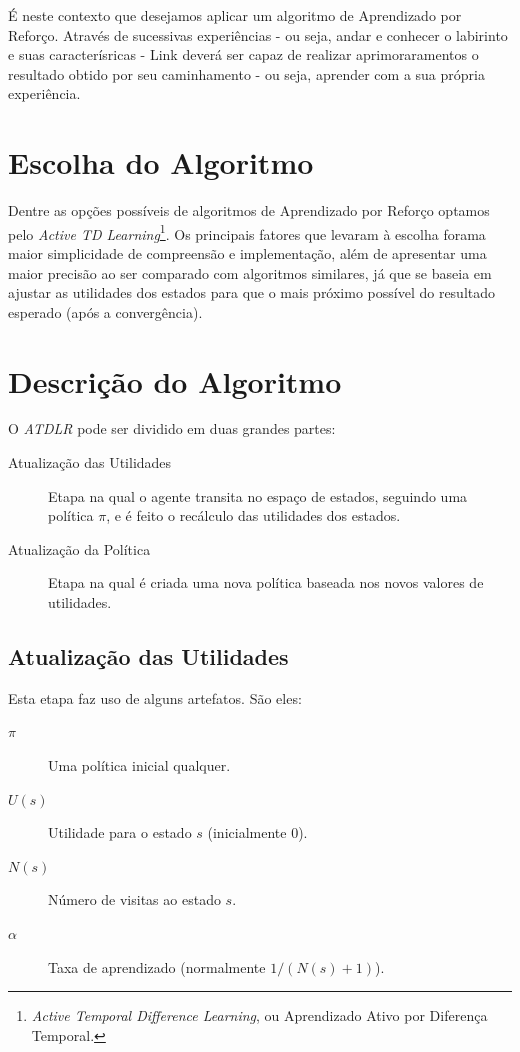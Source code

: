 \documentclass[letterpaper]{article}
\begin{document}
É neste contexto que desejamos aplicar um algoritmo de Aprendizado por Reforço. Através de
sucessivas experiências - ou seja, andar e conhecer o labirinto e suas caracterísricas - Link
deverá ser capaz de realizar aprimoraramentos o resultado obtido por seu caminhamento - ou seja,
aprender com a sua própria experiência.

\section{Escolha do Algoritmo}

Dentre as opções possíveis de algoritmos de Aprendizado por Reforço optamos pelo
\textit{Active TD Learning}\footnote{\textit{Active Temporal Difference Learning}, ou Aprendizado
Ativo por Diferença Temporal.}. Os principais fatores que levaram à escolha forama maior
simplicidade de compreensão e implementação, além de apresentar uma maior precisão ao ser
comparado com algoritmos similares, já que se baseia em ajustar as utilidades dos estados para
que o mais próximo possível do resultado esperado (após a convergência).

\section{Descrição do Algoritmo}

O \textit{ATDLR} pode ser dividido em duas grandes partes:

\begin{description}
\item[Atualização das Utilidades] Etapa na qual o agente transita no espaço de estados,
seguindo uma política $\pi$, e é feito o recálculo das utilidades dos estados.
\item[Atualização da Política] Etapa na qual é criada uma nova política baseada nos
novos valores de utilidades.
\end{description}

\subsection{Atualização das Utilidades}

Esta etapa faz uso de alguns artefatos. São eles:

\begin{description}
\item[$\pi$] Uma política inicial qualquer.
\item[$U(s)$] Utilidade para o estado $s$ (inicialmente $0$).
\item[$N(s)$] Número de visitas ao estado $s$.
\item[$\alpha$] Taxa de aprendizado (normalmente $1/(N(s)+1)$).
\end{description}
\end{document}
